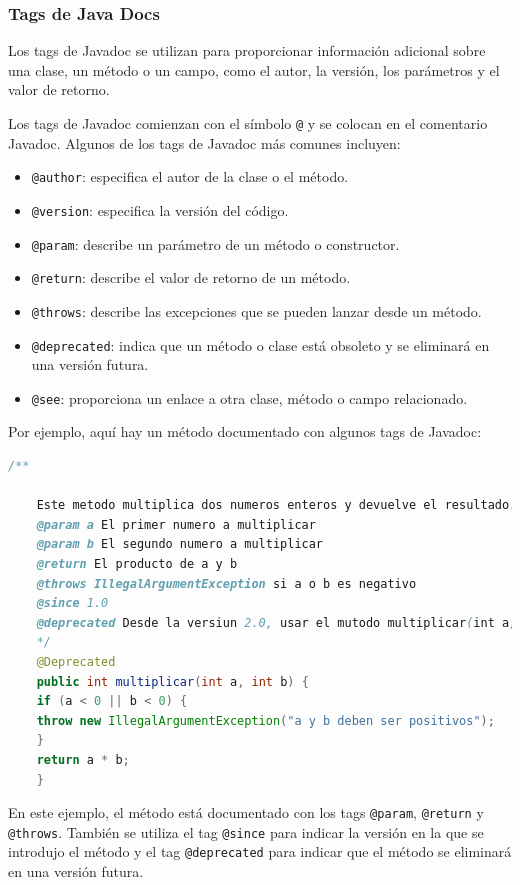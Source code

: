 \documentclass[executivepaper]{article}
\begin{document}
\subsubsection{Tags de Java Docs}
Los tags de Javadoc se utilizan para proporcionar información adicional sobre una clase, un método o un campo, como el autor, la versión, los parámetros y el valor de retorno.

Los tags de Javadoc comienzan con el símbolo \texttt{@} y se colocan en el comentario Javadoc. Algunos de los tags de Javadoc más comunes incluyen:

\begin{itemize}
\item \texttt{@author}: especifica el autor de la clase o el método.
\item \texttt{@version}: especifica la versión del código.
\item \texttt{@param}: describe un parámetro de un método o constructor.
\item \texttt{@return}: describe el valor de retorno de un método.
\item \texttt{@throws}: describe las excepciones que se pueden lanzar desde un método.
\item \texttt{@deprecated}: indica que un método o clase está obsoleto y se eliminará en una versión futura.
\item \texttt{@see}: proporciona un enlace a otra clase, método o campo relacionado.
\end{itemize}

Por ejemplo, aquí hay un método documentado con algunos tags de Javadoc:
\begin{lstlisting}[language=Java]
    /**
    
    Este metodo multiplica dos numeros enteros y devuelve el resultado.
    @param a El primer numero a multiplicar
    @param b El segundo numero a multiplicar
    @return El producto de a y b
    @throws IllegalArgumentException si a o b es negativo
    @since 1.0
    @deprecated Desde la versiun 2.0, usar el mutodo multiplicar(int a, int b, int c)
    */
    @Deprecated
    public int multiplicar(int a, int b) {
    if (a < 0 || b < 0) {
    throw new IllegalArgumentException("a y b deben ser positivos");
    }
    return a * b;
    }
    \end{lstlisting}
    En este ejemplo, el método está documentado con los tags \texttt{@param}, \texttt{@return} y \texttt{@throws}. También se utiliza el tag \texttt{@since} para indicar la versión en la que se introdujo el método y el tag \texttt{@deprecated} para indicar que el método se eliminará en una versión futura.
\end{document}
